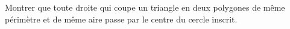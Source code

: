 Montrer que toute droite qui coupe un triangle en deux polygones de même périmètre et de même aire passe par le centre du cercle inscrit.
